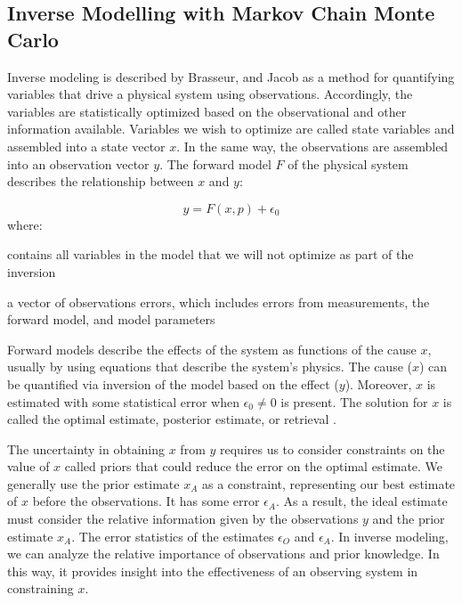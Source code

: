 \subsection{ Inverse Modelling with Markov Chain Monte Carlo}\label{c3_mcmc}
\begin{flushleft}
    Inverse modeling is described by Brasseur, and Jacob \cite{brasseur_modeling_2017} as a method for quantifying variables that drive a physical system using observations. Accordingly, the variables are statistically optimized based on the observational and other information available. Variables we wish to optimize are called state variables and assembled into a state vector $x$. In the same way, the observations are assembled into an observation vector $y$. The forward model $F$ of the physical system describes the relationship between $x$ and $y$:

    \begin{equation}
\label{inverse_model}
y=F(x,p) + \epsilon_0
\end{equation}
where:\\
\begin{description}[leftmargin=!,labelwidth={3 em}]
    \item [$p$] contains all variables in the model that we will not optimize as part of the inversion
    \item [$\epsilon_0$] a vector of observations errors, which includes errors from measurements, the forward model, and model parameters 
\end{description}
 Forward models describe the effects of the system as functions of the cause $x$, usually by using equations that describe the system's physics. The cause ($x$) can be quantified via inversion of the model based on the effect ($y$). Moreover, $x$ is estimated with some statistical error when $\epsilon_0 \neq 0$ is present. The solution for $x$ is called the optimal estimate, posterior estimate, or retrieval \cite{brasseur_modeling_2017}. 
 \end{flushleft}

\begin{flushleft}
    The uncertainty in obtaining $x$ from $y$ requires us to consider constraints on the value of $x$ called priors that could reduce the error on the optimal estimate.  We generally use the prior estimate $x_A$ as a constraint, representing our best estimate of $x$ before the observations. It has some error $\epsilon_A$. As a result, the ideal estimate must consider the relative information given by the observations $y$ and the prior estimate $x_A$. The error statistics of the estimates $\epsilon_O$ and $\epsilon_A$. In inverse modeling, we can analyze the relative importance of observations and prior knowledge. In this way, it provides insight into the effectiveness of an observing system in constraining $x$\cite{brasseur_modeling_2017}.

    \end{flushleft}

